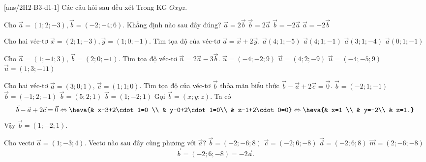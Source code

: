 \BTTN
{}[ans/2H2-B3-d1-1]
Các câu hỏi sau đều xét Trong KG $Oxyz$.
\begin{ex}
	Cho $\vec{a}=(1;2;-3),\vec{b}=(-2;-4;6)$. Khẳng định nào sau đây đúng?
	\choice
	{$\vec{a}=2\vec{b}$}
	{$\vec{b}=2\vec{a}$}
	{\True $\vec{b}=-2\vec{a}$}
	{$\vec{a}=-2\vec{b}$}
\end{ex} 

\begin{ex}
	Cho hai véc-tơ $\vec{x}=(2;1;-3),\vec{y}=(1;0;-1)$. Tìm tọa độ của véc-tơ $\vec{a}=\vec{x}+2\vec{y}$.
	\choice
	{\True $\vec{a}(4;1;-5)$}
	{$\vec{a}(4;1;-1)$}
	{$\vec{a}(3;1;-4)$}
	{$\vec{a}(0;1;-1)$}
\end{ex} 

\begin{ex}
	Cho $\vec{a}=(1;-1;3)$, $\vec{b}=(2;0;-1)$. Tìm tọa độ véc-tơ $\vec{u}=2\vec{a}-3\vec{b}$.
	\choice
	{\True $\vec{u}=(-4;-2;9)$}
	{$\vec{u}=(4;2;-9)$}
	{$\vec{u}=(-4;-5;9)$}
	{$\vec{u}=(1;3;-11)$}
\end{ex} 

\begin{ex}
	Cho hai véc-tơ  $\vec{a}=(3;0;1)$,  $\vec{c}=(1;1;0)$. Tìm tọa độ của véc-tơ $\vec{b}$ thỏa mãn biểu thức  $\vec{b}-\vec{a}+2\vec{c}=\vec{0}$.
	\choice
	{$\vec{b}=(-2;1;-1)$}
	{$\vec{b}=(-1;2;-1)$}
	{$\vec{b}=(5;2;1)$}
	{\True $\vec{b}=(1;-2;1)$}
	\loigiai
	{Gọi $\vec{b}=\left(x; y; z\right)$. Ta có
		$$\vec{b}-\vec{a}+2\vec{c}=\vec{0}\Leftrightarrow\heva{& x-3+2\cdot 1=0 \\ & y-0+2\cdot 1=0\\ & z-1+2\cdot 0=0}\Leftrightarrow\heva{& x=1 \\ & y=-2\\ & z=1.}$$
		Vậy $\vec{b}=(1;-2;1)$.
	}
\end{ex} 

\begin{ex}
	Cho vectơ $\vec{a}=(1;-3;4)$. Vectơ  nào sau đây cùng phương với $\vec{a}$?
	\choice
	{$\vec{b}=(-2;-6;8)$}
	{\True $\vec{c}=(-2;6;-8)$}
	{$\vec{d}=(-2;6;8)$}
	{$\vec{m}=(2;-6;-8)$}
	\loigiai
	{
		$$\vec{b}=(-2;6;-8)=-2\vec{a}.$$
	}
\end{ex} 

